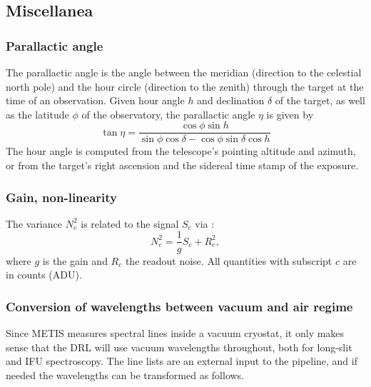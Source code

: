 \subsection{Miscellanea}
\label{ssec:miscellanea}

\subsubsection{Parallactic angle}
\label{sssec:parallactic_angle}

The parallactic angle is the angle between the meridian (direction to the celestial north pole) and the hour circle (direction to the zenith) through the target at the time of an observation. Given hour angle $h$ and declination $\delta$ of the target, as well as the latitude $\phi$ of the observatory, the parallactic angle $\eta$ is given by
\begin{equation}
  \label{eq:parallactic_angle}
  \tan\eta = \frac{\cos\phi\sin h}{\sin\phi \cos\delta - \cos\phi \sin\delta \cos h}
\end{equation}
The hour angle is computed from the telescope's pointing altitude and azimuth, or from the target's right ascension and the sidereal time stamp of the exposure.

\subsubsection{Gain, non-linearity}
\label{sssec:gain}

The variance $N_{c}^{2}$ is related to the signal $S_{c}$ via \cite[Section 9.1]{McLean2008}:
\begin{equation}
  \label{eq:signal-variance}
  N_{c}^{2} = \frac{1}{g} S_{c} + R_{c}^{2},
\end{equation}
where $g$ is the gain and $R_{c}$ the readout noise. All quantities with subscript $c$ are in counts (ADU).

\subsubsection{Conversion of wavelengths between vacuum and air regime}\label{ssec:vacair}

Since METIS measures spectral lines inside a vacuum cryostat, it only makes
sense that the DRL will use vacuum wavelengths throughout, both for long-slit
and IFU spectroscopy. The line lists are an external input to the pipeline, and
if needed the wavelengths can be transformed as follows.

